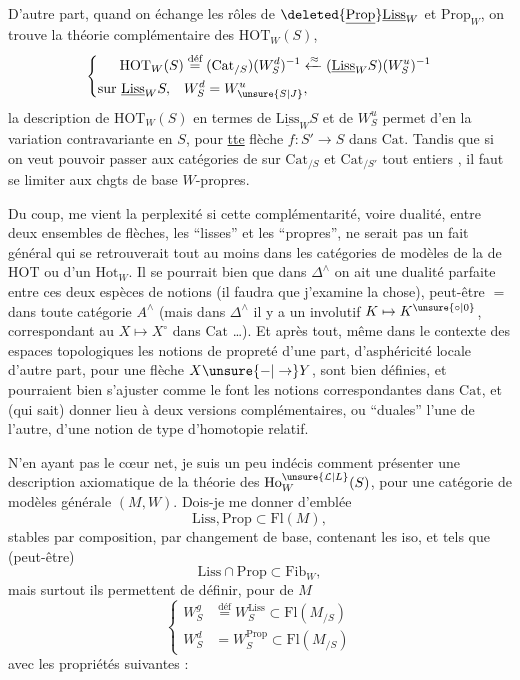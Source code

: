 D'autre part, quand on échange les rôles de $\deleted{\underline{\mathrm{Prop}}}\underline{\mathrm{Liss}}_W$ et $\mathrm{Prop}_W$, on trouve la théorie complémentaire des $\mathrm{HOT}_W(S)$,
\[
\left\{\begin{aligned}
\mathrm{HOT}_W(S)&\overset{\text{déf}}{=}(\mathrm{Cat}_{/S})(W_S^d)^{-1}
\xleftarrow{\approx}(\underline{\mathrm{Liss}}_W S)(W_S^u)^{-1}\\
\text{sur }\underline{\mathrm{Liss}}_W S,\quad &W_S^d=W_{\unsure{S|J}}^u,
\end{aligned}\right.
\]
la description de $\mathrm{HOT}_W(S)$ en termes de $\underline{\mathrm{Liss}}_W S$ et de $W_S^u$ permet d'en   la variation contravariante en $S$, pour \uline{tte} flèche $f:S'\longrightarrow S$ dans $\mathrm{Cat}$. Tandis que si on veut pouvoir passer aux catégories de  sur $\mathrm{Cat}_{/S}$ et $\mathrm{Cat}_{/S'}$ tout entiers , il faut se limiter aux chgts de base $W$-propres.

Du coup, me vient la perplexité si cette complémentarité, voire  dualité, entre deux ensembles de flèches, les ``lisses'' et les ``propres'', ne serait pas un fait général qui se retrouverait tout au moins dans les catégories de modèles  de la  de $\mathrm{HOT}$ ou d'un $\mathrm{Hot}_W$.
Il se pourrait bien que dans $\Delta^\wedge$ on ait une dualité parfaite entre ces deux espèces de notions (il faudra que j'examine la chose), peut-être $=$ dans toute catégorie $A^\wedge$ (mais dans $\Delta^\wedge$ il y a un  involutif $K\mapsto K^{\unsure{\circ|0}}$, correspondant au $X\mapsto X^\circ$ dans $\mathrm{Cat}$ \ldots).  Et après tout, même dans le contexte des espaces topologiques les notions de propreté d'une part, d'asphéricité locale d'autre part, pour une flèche $X\unsure{-|\to}Y$, sont bien définies, et pourraient bien s'ajuster comme le font les notions correspondantes dans $\mathrm{Cat}$, et (qui sait) donner lieu à deux versions complémentaires, ou ``duales'' l'une de l'autre, d'une notion de type d'homotopie relatif.

N'en ayant pas le cœur net, je suis un peu indécis comment présenter une description axiomatique de la théorie des $\mathrm{Ho}^{\unsure{\mathcal L|L}}_W(S)$, pour une  catégorie de modèles générale $(M,W)$. Dois-je me donner d'emblée
\[
\mathrm{Liss},\mathrm{Prop}\subset\mathrm{Fl}(M),
\]
 stables par composition, par changement de base, contenant les iso, et tels que (peut-être)
\[
\mathrm{Liss}\cap\mathrm{Prop}\subset\mathrm{Fib}_W,
\]
mais surtout ils permettent de définir, pour  de $M$
\[
\left\{\begin{aligned}
W_S^g&\overset{\text{déf}}{=}W_S^{\mathrm{Liss}}\subset\mathrm{Fl}(M_{/S})\\
W_S^d&=W_S^{\mathrm{Prop}}\subset\mathrm{Fl}(M_{/S})
\end{aligned}\right.
\]
avec les propriétés suivantes :

